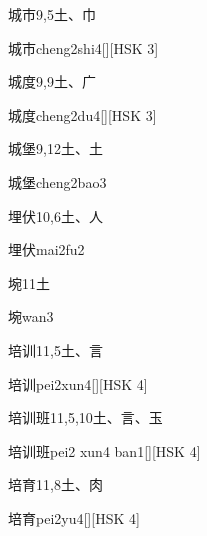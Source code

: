 \begin{entry}{城市}{9,5}{⼟、⼱}
  \begin{phonetics}{城市}{cheng2shi4}[][HSK 3]
  \end{phonetics}
\end{entry}

\begin{entry}{城度}{9,9}{⼟、⼴}
  \begin{phonetics}{城度}{cheng2du4}[][HSK 3]
  \end{phonetics}
\end{entry}

\begin{entry}{城堡}{9,12}{⼟、⼟}
  \begin{phonetics}{城堡}{cheng2bao3}
  \end{phonetics}
\end{entry}

\begin{entry}{埋伏}{10,6}{⼟、⼈}
  \begin{phonetics}{埋伏}{mai2fu2}
  \end{phonetics}
\end{entry}

\begin{entry}{埦}{11}{⼟}
  \begin{phonetics}{埦}{wan3}
  \end{phonetics}
\end{entry}

\begin{entry}{培训}{11,5}{⼟、⾔}
  \begin{phonetics}{培训}{pei2xun4}[][HSK 4]
  \end{phonetics}
\end{entry}

\begin{entry}{培训班}{11,5,10}{⼟、⾔、⽟}
  \begin{phonetics}{培训班}{pei2 xun4 ban1}[][HSK 4]
  \end{phonetics}
\end{entry}

\begin{entry}{培育}{11,8}{⼟、⾁}
  \begin{phonetics}{培育}{pei2yu4}[][HSK 4]
  \end{phonetics}
\end{entry}

